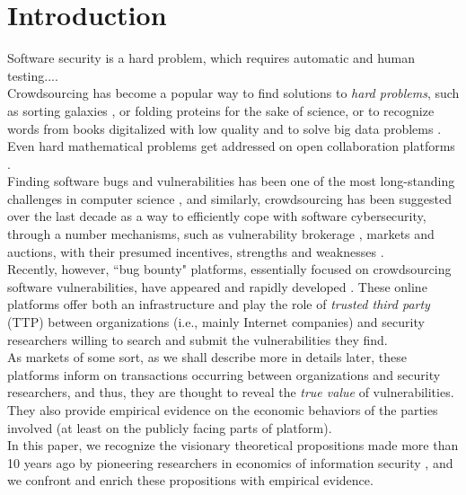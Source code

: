 \section{Introduction}
\label{sec:intro}
Software security is a hard problem, which requires automatic and human testing....\\



Crowdsourcing has become a popular way to find solutions to {\it hard problems}, such as sorting galaxies \cite{}, or folding proteins \cite{} for the sake of science, or to recognize words from books digitalized with low quality \cite{re-captcha} and to solve big data problems \cite{kaggle}. Even hard mathematical problems get addressed on open collaboration platforms \cite{}.\\

Finding software bugs and vulnerabilities has been one of the most long-standing challenges in computer science \cite{}, and similarly, crowdsourcing has been suggested over the last decade as a way to efficiently cope with software cybersecurity, through a number mechanisms, such as vulnerability brokerage \cite{camp2004pricing}, markets \cite{schechter2002buy} and auctions, with their presumed incentives, strengths and weaknesses \cite{ozment2004bug}.\\

Recently, however, ``bug bounty" platforms, essentially focused on crowdsourcing software vulnerabilities, have appeared and rapidly developed \cite{zhao2014exploratory,zhao2015empirical}. These online platforms offer both an infrastructure and play the role of {\it trusted third party} (TTP) between organizations (i.e., mainly Internet companies) and security researchers willing to search and submit the vulnerabilities they find.\\

As markets of some sort, as we shall describe more in details later, these platforms inform on transactions occurring between organizations and security researchers, and thus, they are thought to reveal the {\it true value} of vulnerabilities. They also provide empirical evidence on the economic behaviors of the parties involved (at least on the publicly facing parts of platform).\\

In this paper, we recognize the visionary theoretical propositions made more than 10 years ago by pioneering researchers in economics of information security \cite{schechter2002buy,ozment2004bug}, and we confront and enrich these propositions with empirical evidence.\\

